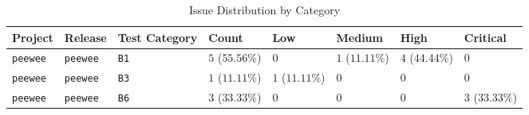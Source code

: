 \begin{table}
\caption{Issue Distribution by Category}
\label{tab:issue-category-distribution}
\begin{tabular}{llllllll}
\toprule
Project & Release & Test Category & Count & Low & Medium & High & Critical \\
\midrule
\texttt{peewee} & \texttt{peewee} & \texttt{B1} & $5$ ($55.56\%$) & $0$ & $1$ ($11.11\%$) & $4$ ($44.44\%$) & $0$ \\
\texttt{peewee} & \texttt{peewee} & \texttt{B3} & $1$ ($11.11\%$) & $1$ ($11.11\%$) & $0$ & $0$ & $0$ \\
\texttt{peewee} & \texttt{peewee} & \texttt{B6} & $3$ ($33.33\%$) & $0$ & $0$ & $0$ & $3$ ($33.33\%$) \\
\bottomrule
\end{tabular}
\end{table}
